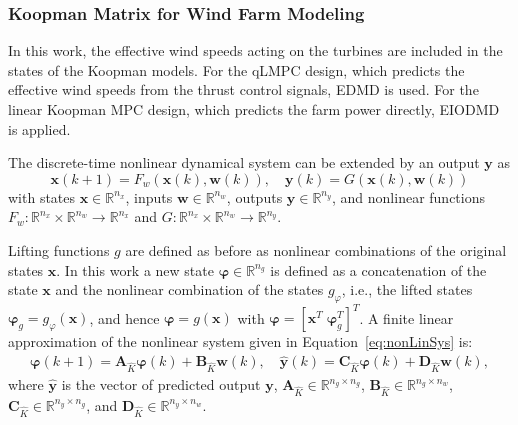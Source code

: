 \subsubsection{Koopman Matrix for Wind Farm Modeling}\label{KoopmanIdentification}

In this work, the effective wind speeds acting on the turbines are included in the states of the Koopman models. For the qLMPC design, which predicts the effective wind speeds from the thrust control signals, EDMD is used. For the linear Koopman MPC design, which predicts the farm power directly, EIODMD is applied.

The discrete-time nonlinear dynamical system can be extended by an output $\bm{y}$ as
\begin{equation}
    \bm{x}(k+1) = F_w(\bm{x}(k), \bm{w}(k)), \quad 
    \bm{y}(k) = G(\bm{x}(k), \bm{w}(k)) \label{eq:nonLinSys}
\end{equation}
with states $\bm{x} \in \mathbb{R}^{n_{x}}$, inputs $\bm{w} \in \mathbb{R}^{n_{w}}$, outputs $\bm{y} \in \mathbb{R}^{n_{y}}$, and nonlinear functions $F_w : \mathbb{R}^{n_{x}} \times \mathbb{R}^{n_{w}} \to \mathbb{R}^{n_{x}}$ and $G : \mathbb{R}^{n_{x}} \times \mathbb{R}^{n_{w}} \to \mathbb{R}^{n_{y}}$.


Lifting functions $g$ are defined as before as nonlinear combinations of the original states $\bm{x}$. In this work a new state $\bm{\varphi}\in\mathbb{R}^{n_{g}}$ is defined as a concatenation of the state $\bm{x}$ and the nonlinear combination of the states $g_{\varphi}$, i.e., the lifted states $\bm{\varphi}_g = g_{\varphi}(\bm{x})$, and hence $ \bm{\varphi} = g(\bm{x})$ with $\bm{\varphi} = [\bm{x}^T \; \bm{\varphi}_g^T]^T$.
%
A finite linear approximation of the nonlinear system given in Equation~\eqref{eq:nonLinSys} is:
\begin{align*}
    \bm{\varphi}(k+1)=\bm{A}_{\hat{K}}\bm{\varphi}(k)+\bm{B}_{\hat{K}}\bm{w}(k), \quad 
    \hat{\bm{y}}(k) = \bm{C}_{\hat{K}}\bm{\varphi}(k) + \bm{D}_{\hat{K}}\bm{w}(k),%
\end{align*}
where $\hat{\bm{y}}$ is the vector of predicted output $\bm{y}$, $\bm{A}_{\hat{K}}\in \mathbb{R}^{{n_g}\times {n_g}}$, $\bm{B}_{\hat{K}}\in \mathbb{R}^{n_g\times n_w}$, $\bm{C}_{\hat{K}}\in \mathbb{R}^{n_y\times n_g}$, and $\bm{D}_{\hat{K}}\in \mathbb{R}^{n_y\times n_w}$.

